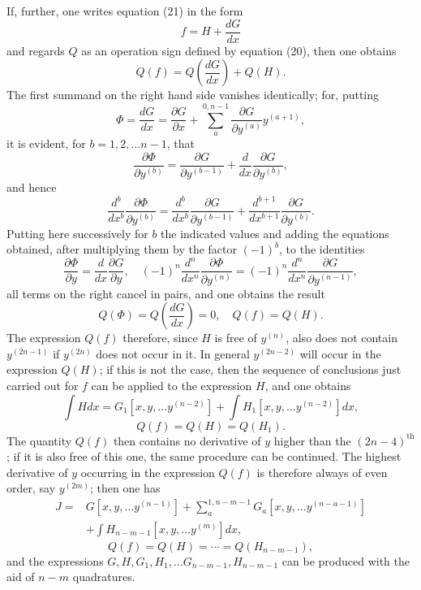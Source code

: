 \documentclass[11pt,a4paper,leqno]{article}
\begin{document}
If, further, one writes equation (21) in the form
\[
f=H+\frac{dG}{dx}
\]
and regards $Q$ as an operation sign defined by equation (20), then one obtains
\[
Q(f)=Q\left(\frac{dG}{dx}\right)+Q(H).
\]
The first summand on the right hand side vanishes identically; for, putting
\[
\Phi=\frac{dG}{dx}=\frac{\partial G}{\partial x}+\sum_a^{0,n-1}\frac{\partial G}{\partial y^{(a)}}y^{(a+1)},
\]
it is evident, for $b=1,2,\ldots n-1$, that
\[
\frac{\partial\Phi}{\partial y^{(b)}}=\frac{\partial G}{\partial y^{(b-1)}}+\frac{d}{dx}\frac{\partial G}{\partial y^{(b)}},
\]
and hence
\[
\frac{d^b}{dx^b}\frac{\partial\Phi}{\partial y^{(b)}}=\frac{d^b}{dx^b}\frac{\partial G}{\partial y^{(b-1)}}+\frac{d^{b+1}}{dx^{b+1}}\frac{\partial G}{\partial y^{(b)}}.
\]
Putting here successively for $b$ the indicated values and adding the equations obtained, after multiplying them by the factor $(-1)^b$, to the identities
\[
\frac{\partial\Phi}{\partial y}=\frac{d}{dx}\frac{\partial G}{\partial y},
\quad
(-1)^n\frac{d^n}{dx^n}\frac{\partial\Phi}{\partial y^{(n)}}=(-1)^n\frac{d^n}{dx^n}\frac{\partial G}{\partial y^{(n-1)}},
\]
all terms on the right cancel in pairs, and one obtains the result
\begin{equation}\tag{22}
Q(\Phi)=Q\left(\frac{dG}{dx}\right)=0,
\quad
Q(f)=Q(H).
\end{equation}
The expression $Q(f)$ therefore, since $H$ is free of $y^{(n)}$, also does not contain $y^{(2n-1)}$ if $y^{(2n)}$ does not occur in it. In general $y^{(2n-2)}$ will occur in the expression $Q(H)$; if this is not the case, then the sequence of conclusions just carried out for $f$ can be applied to the expression $H$, and one obtains
\[
\int Hdx=G_1[x,y,\ldots y^{(n-2)}]+\int H_1[x,y,\ldots y^{(n-2)}]dx,
\]
\[
Q(f)=Q(H)=Q(H_1).
\]
The quantity $Q(f)$ then contains no derivative of $y$ higher than the $(2n-4)^{\mathrm{th}}$; if it is also free of this one, the same procedure can be continued. The highest derivative of $y$ occurring in the expression $Q(f)$ is therefore always of even order, say $y^{(2m)}$; then one has
\begin{equation}\tag{23}
\begin{aligned}
J={}&G[x,y,\ldots y^{(n-1)}]+\sum_a^{1,n-m-1}G_a[x,y,\ldots y^{(n-a-1)}] \\
&+\int H_{n-m-1}[x,y,\ldots y^{(m)}]dx,
\end{aligned}
\end{equation}
\[
Q(f)=Q(H)=\cdots=Q(H_{n-m-1}),
\]
and the expressions $G,H,G_1,H_1,\ldots G_{n-m-1},H_{n-m-1}$ can be produced with the aid of $n-m$ quadratures.
\end{document}
